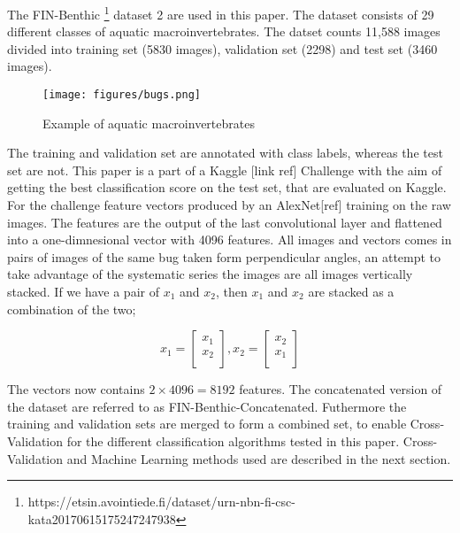 The FIN-Benthic  \footnote{https://etsin.avointiede.fi/dataset/urn-nbn-fi-csc-kata20170615175247247938} dataset 2 are used in this paper. The dataset consists of 29 different classes of aquatic macroinvertebrates. The datset counts 11,588 images divided into training set (5830 images), validation set (2298) and test set (3460 images). 

\begin{figure}[H]
    \centering
    \texttt{[image: figures/bugs.png]}
    \caption{Example of aquatic macroinvertebrates}
\end{figure}

The training and validation set are annotated with class labels, whereas the test set are not. This paper is a part of a Kaggle [link ref] Challenge with the aim of getting the best classification score on the test set, that are evaluated on Kaggle. For the challenge feature vectors produced by an AlexNet[ref] training on the raw images. The features are the output of the last convolutional layer and flattened into a one-dimnesional vector with 4096 features. All images and vectors comes in pairs of images of the same bug taken form perpendicular angles, an attempt to take advantage of the systematic series the images are all images vertically stacked. If we have a pair of $x_1$ and $x_2$, then $x_1$ and $x_2$ are stacked as a combination of the two; 

$$x_1=\begin{bmatrix} x_{1} \\ x_{2} \\ \end{bmatrix}, x_2 = \begin{bmatrix} x_{2} \\ x_{1} \\ \end{bmatrix}$$

The vectors now contains $2 \times 4096 = 8192$ features. The concatenated version of the dataset are referred to as FIN-Benthic-Concatenated. Futhermore the training and validation sets are merged to form a combined set, to enable Cross-Validation for the different classification algorithms tested in this paper. Cross-Validation and Machine Learning methods used are described in the next section.